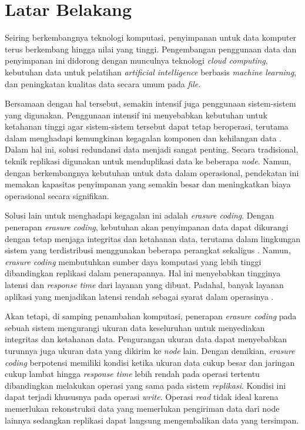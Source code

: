 \section{Latar Belakang}
\label{sec:latar-belakang}

Seiring berkembangnya teknologi komputasi, penyimpanan untuk data komputer terus berkembang hingga nilai yang tinggi. Pengembangan penggunaan data dan penyimpanan ini didorong dengan munculnya teknologi \textit{cloud computing}, kebutuhan data untuk pelatihan \textit{artificial intelligence} berbasis \textit{machine learning}, dan peningkatan kualitas data secara umum pada \textit{file}.

Bersamaan dengan hal tersebut, semakin intensif juga penggunaan sistem-sistem yang digunakan. Penggunaan intensif ini menyebabkan kebutuhan untuk ketahanan tinggi agar sistem-sistem tersebut dapat tetap beroperasi, terutama dalam menghadapi kemungkinan kegagalan komponen dan kehilangan data \parencite{weatherspoon2002erasure}. Dalam hal ini, solusi redundansi data menjadi sangat penting. Secara tradisional, teknik replikasi digunakan untuk menduplikasi data ke beberapa \textit{node}. Namun, dengan berkembangnya kebutuhan untuk data dalam operasional, pendekatan ini memakan kapasitas penyimpanan yang semakin besar dan meningkatkan biaya operasional secara signifikan.

Solusi lain untuk menghadapi kegagalan ini adalah \textit{erasure coding}. Dengan penerapan \textit{erasure coding}, kebutuhan akan penyimpanan data dapat dikurangi dengan tetap menjaga integritas dan ketahanan data, terutama dalam lingkungan sistem yang terdistribusi menggunakan beberapa perangkat sekaligus \parencite{balaji2018erasure}. Namun, \textit{erasure coding} membutuhkan sumber daya komputasi yang lebih tinggi dibandingkan replikasi dalam penerapannya. Hal ini menyebabkan tingginya latensi dan \textit{response time} dari layanan yang dibuat. Padahal, banyak layanan aplikasi yang menjadikan latensi rendah sebagai syarat dalam operasinya \parencite{dean2013tail}.

Akan tetapi, di samping penambahan komputasi, penerapan \textit{erasure coding} pada sebuah sistem mengurangi ukuran data keseluruhan untuk menyediakan integritas dan ketahanan data. Pengurangan ukuran data dapat menyebabkan turunnya juga ukuran data yang dikirim ke \textit{node} lain. Dengan demikian, \textit{erasure coding} berpotensi memiliki kondisi ketika ukuran data cukup besar dan jaringan cukup lambat hingga \textit{response time} lebih rendah pada operasi tertentu dibandingkan melakukan operasi yang sama pada sistem \textit{replikasi}. Kondisi ini dapat terjadi khususnya pada operasi \textit{write}. Operasi \textit{read} tidak ideal karena memerlukan rekonstruksi data yang memerlukan pengiriman data dari node lainnya sedangkan replikasi dapat langsung mengembalikan data yang tersimpan.

